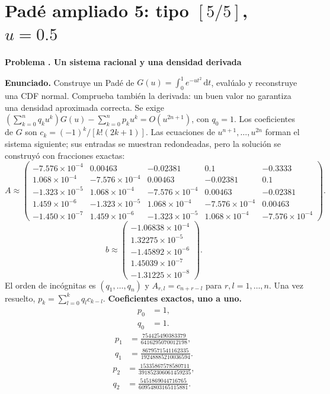 \documentclass[11pt,a4paper]{article}
\newcommand{\dd}{\,\mathrm d}
\theoremstyle{definition}
\newcounter{problema}
\newenvironment{resuelto}[1]{\refstepcounter{problema}\par\medskip\Needspace{6\baselineskip}\textbf{Problema \theproblema. #1}\par}{\par\medskip}
\begin{document}
\section{\texorpdfstring{Padé ampliado 5: tipo $[5/5]$, $u=0.5$}{Padé ampliado 5: tipo [5/5], u=0.5}}
\begin{resuelto}{Un sistema racional y una densidad derivada}
\textbf{Enunciado.} Construye un Padé de $G(u)=\int_0^1e^{-ut^2}\dd t$, evalúalo y reconstruye una CDF normal. Comprueba también la derivada: un buen valor no garantiza una densidad aproximada correcta.
Se exige $(\sum_{k=0}^{n}q_ku^k)G(u)-\sum_{k=0}^{n}p_ku^k=O(u^{2n+1})$, con $q_0=1$. Los coeficientes de $G$ son $c_k=(-1)^k/[k!(2k+1)]$.
Las ecuaciones de $u^{n+1},\ldots,u^{2n}$ forman el sistema siguiente; sus entradas se muestran redondeadas, pero la solución se construyó con fracciones exactas:
{\small
\[
A\approx\begin{pmatrix}-7.576\times10^{-4}&0.00463&-0.02381&0.1&-0.3333\\1.068\times10^{-4}&-7.576\times10^{-4}&0.00463&-0.02381&0.1\\-1.323\times10^{-5}&1.068\times10^{-4}&-7.576\times10^{-4}&0.00463&-0.02381\\1.459\times10^{-6}&-1.323\times10^{-5}&1.068\times10^{-4}&-7.576\times10^{-4}&0.00463\\-1.450\times10^{-7}&1.459\times10^{-6}&-1.323\times10^{-5}&1.068\times10^{-4}&-7.576\times10^{-4}\end{pmatrix}.
\]
\[
b\approx\begin{pmatrix}-1.06838\times10^{-4}\\1.32275\times10^{-5}\\-1.45892\times10^{-6}\\1.45039\times10^{-7}\\-1.31225\times10^{-8}\end{pmatrix}.
\]
}
El orden de incógnitas es $(q_1,\ldots,q_n)$ y $A_{r,l}=c_{n+r-l}$ para $r,l=1,\ldots,n$. Una vez resuelto, $p_k=\sum_{l=0}^{k}q_lc_{k-l}$.
\textbf{Coeficientes exactos, uno a uno.}
\[
\begin{aligned}p_0&=1,\\q_0&=1.\end{aligned}
\]
\[
\begin{aligned}p_1&=\frac{754425490383379}{6416295070012198},\\q_1&=\frac{8679571541162335}{19248885210036594}.\end{aligned}
\]
\[
\begin{aligned}p_2&=\frac{15335867578580711}{391852306061459235},\\q_2&=\frac{5451869044716765}{60954803165115881}.\end{aligned}
\]
\end{resuelto}
\end{document}
